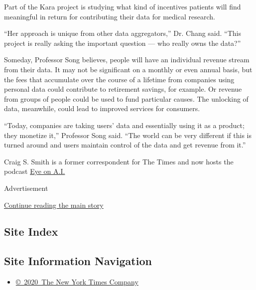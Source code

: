 Part of the Kara project is studying what kind of incentives patients
will find meaningful in return for contributing their data for medical
research.

``Her approach is unique from other data aggregators,'' Dr. Chang said.
``This project is really asking the important question --- who really
owns the data?''

Someday, Professor Song believes, people will have an individual revenue
stream from their data. It may not be significant on a monthly or even
annual basis, but the fees that accumulate over the course of a lifetime
from companies using personal data could contribute to retirement
savings, for example. Or revenue from groups of people could be used to
fund particular causes. The unlocking of data, meanwhile, could lead to
improved services for consumers.

``Today, companies are taking users' data and essentially using it as a
product; they monetize it,'' Professor Song said. ``The world can be
very different if this is turned around and users maintain control of
the data and get revenue from it.''

Craig S. Smith is a former correspondent for The Times and now hosts the
podcast \href{https://www.eye-on.ai}{Eye on A.I.}

Advertisement

\protect\hyperlink{after-bottom}{Continue reading the main story}

\hypertarget{site-index}{%
\subsection{Site Index}\label{site-index}}

\hypertarget{site-information-navigation}{%
\subsection{Site Information
Navigation}\label{site-information-navigation}}

\begin{itemize}
\tightlist
\item
  \href{https://help.nytimes.com/hc/en-us/articles/115014792127-Copyright-notice}{©~2020~The
  New York Times Company}
\end{itemize}


